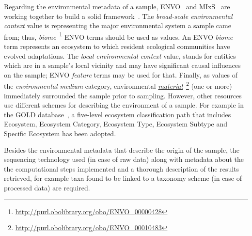       Regarding the environmental metadata of a sample, 
      ENVO~\cite{buttigieg2016environment} and MIxS~\cite{yilmaz2011minimum}
      are working together to build a solid framework~\cite{environmentontology_2021}. 
      The \textit{broad-scale environmental context} value is representing the 
      major environmental system a sample came from;
      thus, \textit{\href{http://purl.obolibrary.org/obo/ENVO_00000428}{biome}}~\footnote{\href{http://purl.obolibrary.org/obo/ENVO_00000428}{http://purl.obolibrary.org/obo/ENVO\_00000428}} 
      ENVO terms should be used as values. 
      An ENVO \textit{biome} term represents an ecosystem to which resident ecological communities have evolved adaptations.
      The \textit{local environmental context} value, stands for 
      entities which are in a sample's local vicinity and may have significant causal influences on the sample; 
      ENVO \textit{feature} terms may be used for that.
      Finally, 
      as values of the \textit{environmental medium} 
      category, 
      environmental \textit{\href{http://purl.obolibrary.org/obo/ENVO_00010483}{material}}~\footnote{\href{http://purl.obolibrary.org/obo/ENVO_00010483}{http://purl.obolibrary.org/obo/ENVO\_00010483}} (one or more) 
      immediately surrounded 
      the sample prior to sampling.
      However, other resources 
      use different schemes for describing the environment of a sample.
      For example in the GOLD database~\cite{mukherjee2021genomes},
      a five-level ecosystem classification path that includes 
      Ecosystem, Ecosystem Category, Ecosystem Type, Ecosystem Subtype and
      Specific Ecosystem
      has been adopted. 

      Besides the environmental metadata that describe the origin of the sample,
      the sequencing technology used (in case of raw data)
      along with metadata about the
      the computational steps implemented 
      and a thorough description of the results retrieved, for example  
      taxa found to be linked to a taxonomy scheme (in case of processed data)
      are required. 
      
